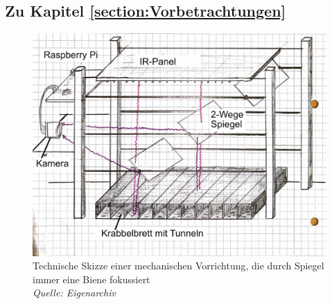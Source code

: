 \documentclass[11pt,a4paper]{article}
\begin{document}
\subsection{Zu Kapitel \autoref{section:Vorbetrachtungen}}
\begin{figure}[H] \label{fig:technical-sketch}
    \centering
    \includegraphics[width=.9\textwidth]{images/technische Skizze 1.jpg}
    \caption{Technische Skizze einer mechanischen Vorrichtung, die durch Spiegel immer eine Biene fokussiert\\
    \textit{Quelle: Eigenarchiv}}
\end{figure}
\end{document}
